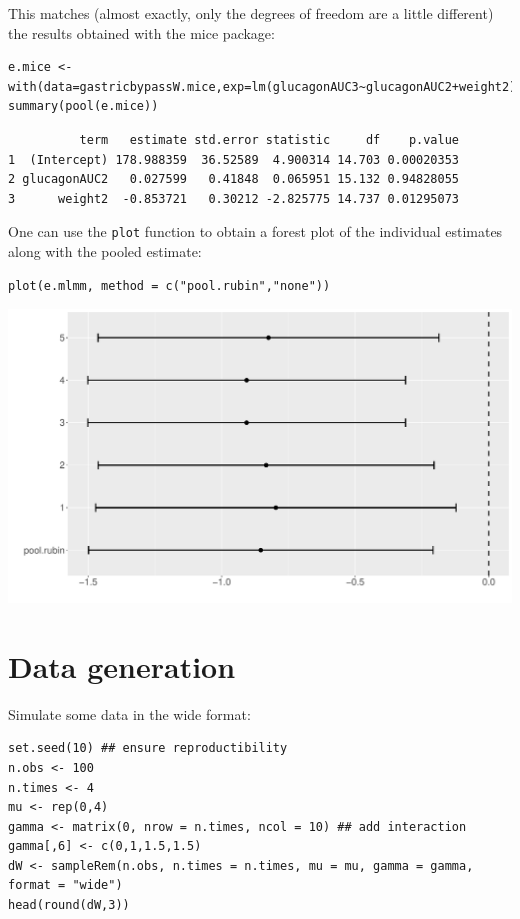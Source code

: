 \documentclass[12pt]{article}
\begin{document}
\clearpage

This matches (almost exactly, only the degrees of freedom are a little
different) the results obtained with the mice package:
\lstset{language=r,label= ,caption= ,captionpos=b,numbers=none}
\begin{lstlisting}
e.mice <- with(data=gastricbypassW.mice,exp=lm(glucagonAUC3~glucagonAUC2+weight2))
summary(pool(e.mice))
\end{lstlisting}

\begin{verbatim}
          term   estimate std.error statistic     df    p.value
1  (Intercept) 178.988359  36.52589  4.900314 14.703 0.00020353
2 glucagonAUC2   0.027599   0.41848  0.065951 15.132 0.94828055
3      weight2  -0.853721   0.30212 -2.825775 14.737 0.01295073
\end{verbatim}


One can use the \texttt{plot} function to obtain a forest plot of the
individual estimates along with the pooled estimate:
\lstset{language=r,label= ,caption= ,captionpos=b,numbers=none}
\begin{lstlisting}
plot(e.mlmm, method = c("pool.rubin","none"))
\end{lstlisting}

\begin{center}
\includegraphics[trim={0 0 0 0},width=1\textwidth]{./figures/forestplot.pdf}
\end{center}

\clearpage

\section{Data generation}
\label{sec:orge8ea4dd}
Simulate some data in the wide format:
\lstset{language=r,label= ,caption= ,captionpos=b,numbers=none}
\begin{lstlisting}
set.seed(10) ## ensure reproductibility
n.obs <- 100
n.times <- 4
mu <- rep(0,4)
gamma <- matrix(0, nrow = n.times, ncol = 10) ## add interaction
gamma[,6] <- c(0,1,1.5,1.5)
dW <- sampleRem(n.obs, n.times = n.times, mu = mu, gamma = gamma, format = "wide")
head(round(dW,3))
\end{lstlisting}
\end{document}
